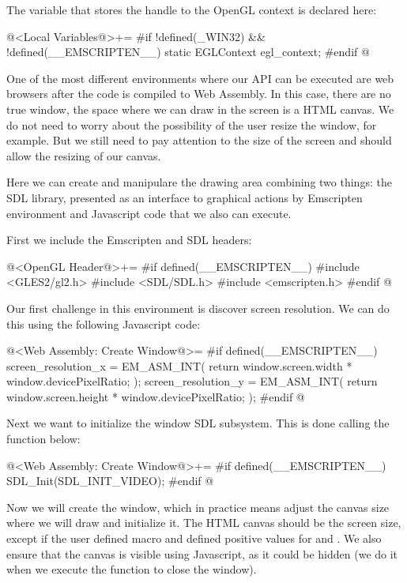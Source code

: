 The variable that stores the handle to the OpenGL context is declared
here:

\iniciocodigo
@<Local Variables@>+=
#if !defined(_WIN32) && !defined(__EMSCRIPTEN__)
static EGLContext egl_context;
#endif
@
\fimcodigo


One of the most different environments where our API can be executed
are web browsers after the code is compiled to Web Assembly. In this
case, there are no true window, the space where we can draw in the
screen is a HTML canvas. We do not need to worry about the possibility
of the user resize the window, for example. But we still need to pay
attention to the size of the screen and should allow the resizing of
our canvas.

Here we can create and manipulare the drawing area combining two
things: the SDL library, presented as an interface to graphical
actions by Emscripten environment and Javascript code that we also can
execute.

First we include the Emscripten and SDL headers:

\iniciocodigo
@<OpenGL Header@>+=
#if defined(__EMSCRIPTEN__)
#include <GLES2/gl2.h>
#include <SDL/SDL.h>
#include <emscripten.h>
#endif
@
\fimcodigo


Our first challenge in this environment is discover screen
resolution. We can do this using the following Javascript code:

\iniciocodigo
@<Web Assembly: Create Window@>=
#if defined(__EMSCRIPTEN__)
screen_resolution_x = EM_ASM_INT({
  return window.screen.width * window.devicePixelRatio;
});
screen_resolution_y = EM_ASM_INT({
  return window.screen.height * window.devicePixelRatio;
});
#endif
@
\fimcodigo

Next we want to initialize the window SDL subsystem. This is done
calling the function below:

\iniciocodigo
@<Web Assembly: Create Window@>+=
#if defined(__EMSCRIPTEN__)
SDL_Init(SDL_INIT_VIDEO);
#endif
@
\fimcodigo

Now we will create the window, which in practice means adjust the
canvas size where we will draw and initialize it. The HTML canvas
should be the screen size, except if the user defined
macro  and defined positive
values for 
and . We also ensure that the
canvas is visible using Javascript, as it could be hidden (we do it
when we execute the function to close the window).

